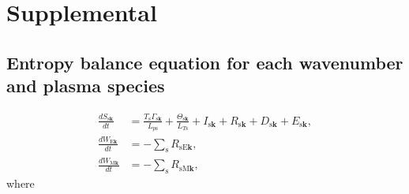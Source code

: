 \chapter{Supplemental}
\label{chap:Supplemental}

\section{Entropy balance equation for each wavenumber and plasma species}
\label{sec:Entropy balance equation for each wavenumber and plasma species}

\begin{align}
  \frac{dS_{\mathrm{s}\bm{k}}}{dt} &= \frac{T_\mathrm{s}\Gamma_{\mathrm{s}\bm{k}}}{L_{p\mathrm{s}}} + \frac{\Theta_{\mathrm{s}\bm{k}}}{L_{T\mathrm{s}}} + I_{\mathrm{s}\bm{k}} + R_{\mathrm{s}\bm{k}} + D_{\mathrm{s}\bm{k}} + E_{\mathrm{s}\bm{k}}, \\
  \frac{dW_{\mathrm{E}\bm{k}}}{dt} &= - \sum_\mathrm{s} R_{\mathrm{sE}\bm{k}}, \\
  \frac{dW_{\mathrm{M}\bm{k}}}{dt} &= - \sum_\mathrm{s} R_{\mathrm{sM}\bm{k}},
\end{align}
where
